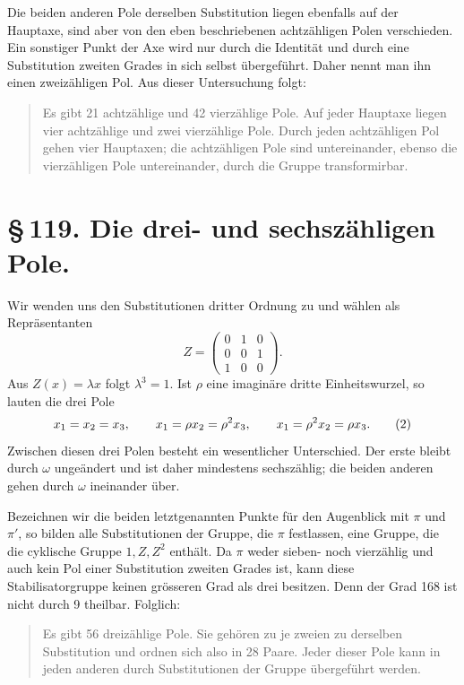 \documentclass[11pt]{article}
\newcommand{\mat}[1]{\begin{pmatrix}#1\end{pmatrix}}
\begin{document}
Die beiden anderen Pole derselben Substitution liegen ebenfalls auf der Hauptaxe, sind aber von den eben beschriebenen achtzähligen Polen verschieden. Ein sonstiger Punkt der Axe wird nur durch die Identität und durch eine Substitution zweiten Grades in sich selbst übergeführt. Daher nennt man ihn einen zweizähligen Pol. Aus dieser Untersuchung folgt:

\begin{quote}
Es gibt 21 achtzählige und 42 vierzählige Pole. Auf jeder Hauptaxe liegen vier achtzählige und zwei vierzählige Pole. Durch jeden achtzähligen Pol gehen vier Hauptaxen; die achtzähligen Pole sind untereinander, ebenso die vierzähligen Pole untereinander, durch die Gruppe transformirbar.
\end{quote}

\section*{\S\,119. Die drei- und sechszähligen Pole.}

Wir wenden uns den Substitutionen dritter Ordnung zu und wählen als Repräsentanten
\begin{equation}
Z=\mat{0&1&0\\0&0&1\\1&0&0}.
\tag{1}
\end{equation}
Aus \(Z(x)=\lambda x\) folgt \(\lambda^3=1\). Ist \(\rho\) eine imaginäre dritte Einheitswurzel, so lauten die drei Pole
\begin{equation}
x_1=x_2=x_3,\notag
\qquad
x_1=\rho x_2=\rho^2x_3,\notag
\qquad
x_1=\rho^2x_2=\rho x_3.
\tag{2}
\end{equation}
Zwischen diesen drei Polen besteht ein wesentlicher Unterschied. Der erste bleibt durch \(\omega\) ungeändert und ist daher mindestens sechszählig; die beiden anderen gehen durch \(\omega\) ineinander über.

Bezeichnen wir die beiden letztgenannten Punkte für den Augenblick mit \(\pi\) und \(\pi'\), so bilden alle Substitutionen der Gruppe, die \(\pi\) festlassen, eine Gruppe, die die cyklische Gruppe \(1,Z,Z^2\) enthält. Da \(\pi\) weder sieben- noch vierzählig und auch kein Pol einer Substitution zweiten Grades ist, kann diese Stabilisatorgruppe keinen grösseren Grad als drei besitzen. Denn der Grad 168 ist nicht durch 9 theilbar. Folglich:

\begin{quote}
Es gibt 56 dreizählige Pole. Sie gehören zu je zweien zu derselben Substitution und ordnen sich also in 28 Paare. Jeder dieser Pole kann in jeden anderen durch Substitutionen der Gruppe übergeführt werden.
\end{quote}
\end{document}
